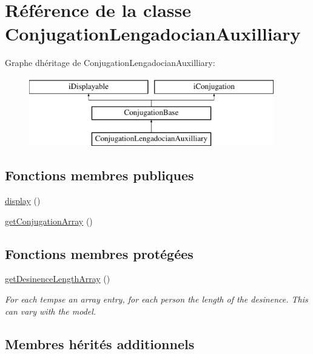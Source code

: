 \hypertarget{classConjugationLengadocianAuxilliary}{}\section{Référence de la classe Conjugation\+Lengadocian\+Auxilliary}
\label{classConjugationLengadocianAuxilliary}
Graphe d\textquotesingle{}héritage de Conjugation\+Lengadocian\+Auxilliary\+:\begin{figure}[H]
\begin{center}
\leavevmode
\includegraphics[height=3.000000cm]{classConjugationLengadocianAuxilliary}
\end{center}
\end{figure}
\subsection*{Fonctions membres publiques}
\begin{DoxyCompactItemize}
\item 
\hyperlink{classConjugationLengadocianAuxilliary_a4edf29f1f54605fc5876ff675827672d}{display} ()
\item 
\hyperlink{classConjugationLengadocianAuxilliary_a19fa4af3fd6382641c641a6eebb9ad68}{get\+Conjugation\+Array} ()
\end{DoxyCompactItemize}
\subsection*{Fonctions membres protégées}
\begin{DoxyCompactItemize}
\item 
\hyperlink{classConjugationLengadocianAuxilliary_a931f205d57b485b89504d879cba60230}{get\+Desinence\+Length\+Array} ()
\begin{DoxyCompactList}\small\item\em For each tempse an array entry, for each person the length of the desinence. This can vary with the model. \end{DoxyCompactList}\end{DoxyCompactItemize}
\subsection*{Membres hérités additionnels}


